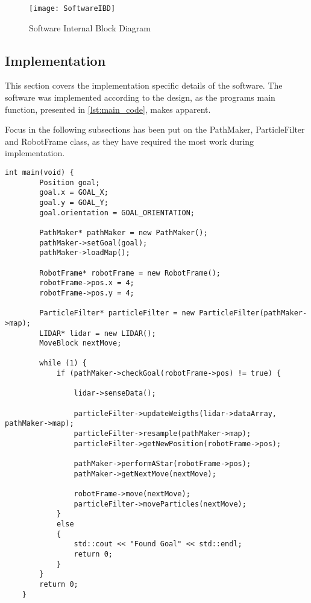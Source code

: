 \documentclass[Main]{subfiles}
\begin{document}
		
		\begin{figure}[H]
			\centering
			\texttt{[image: SoftwareIBD]}
			\caption{Software Internal Block Diagram}
			\label{fig:softwareibd}
		\end{figure}
	
	\subsection{Implementation} %
	\label{sub:software_implementation}
	
	This section covers the implementation specific details of the software.
	The software was implemented according to the design, as the programs main function, presented in \autoref{lst:main_code}, makes apparent.

	Focus in the following subsections has been put on the PathMaker, ParticleFilter and RobotFrame class, as they have required the most work during implementation.

	\newpage
	\begin{lstlisting}[caption=Main Function of Progam, style=Code-C++, label=lst:main_code, basicstyle=\scriptsize]
	int main(void) {
		Position goal;
		goal.x = GOAL_X;
		goal.y = GOAL_Y;
		goal.orientation = GOAL_ORIENTATION;
	
		PathMaker* pathMaker = new PathMaker();
		pathMaker->setGoal(goal);
		pathMaker->loadMap();
	
		RobotFrame* robotFrame = new RobotFrame();
		robotFrame->pos.x = 4;
		robotFrame->pos.y = 4;
	
		ParticleFilter* particleFilter = new ParticleFilter(pathMaker->map);
		LIDAR* lidar = new LIDAR();
		MoveBlock nextMove;
	
		while (1) {
			if (pathMaker->checkGoal(robotFrame->pos) != true) {
				
				lidar->senseData();
				
				particleFilter->updateWeigths(lidar->dataArray, pathMaker->map);
				particleFilter->resample(pathMaker->map);
				particleFilter->getNewPosition(robotFrame->pos);
				
				pathMaker->performAStar(robotFrame->pos);
				pathMaker->getNextMove(nextMove);
				
				robotFrame->move(nextMove);
				particleFilter->moveParticles(nextMove);
			}
			else
			{
				std::cout << "Found Goal" << std::endl;
				return 0;
			}
		}
		return 0;
	}
	
	\end{lstlisting}
	
\end{document}
